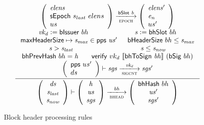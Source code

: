 \documentclass[11pt,a4paper]{article}
\newcommand{\var}[1]{\mathit{#1}}
\newcommand{\fun}[1]{\mathsf{#1}}
\newcommand{\trans}[2]{\xlongrightarrow[\textsc{#1}]{#2}}
\newcommand{\serialised}[1]{\llbracket \var{#1} \rrbracket}
\newcommand{\leteq}{\ensuremath{\mathrel{\mathop:}=}}
\newcommand{\bhdrsizename}{bHeaderSize}
\newcommand{\verifyname}{verify}
\newcommand{\bsigname}{bSig}
\newcommand{\bissuername}{bIssuer}
\newcommand{\verify}[3]{\fun{\verifyname} ~ #1 ~ #2 ~ #3}
\newcommand{\bhdrsize}[1]{\fun{\bhdrsizename} ~ #1}
\newcommand{\bsig}[1]{\fun{\bsigname} ~ #1}
\newcommand{\bissuer}[1]{\fun{\bissuername} ~ #1}
\begin{document}
\begin{figure}[ht]
  \begin{equation*}
    \inference
    { {\left(
          \begin{array}{l}
            \var{elens} \\
            \sepoch{s_{last}}{elens} \\
            us
          \end{array}
        \right)}
      \trans{epoch}{\bslot{b}}
      {\left(
          \begin{array}{l}
            \var{elens'} \\
            \var{e_n} \\
            us'
          \end{array}
        \right)}
      \\
      \var{vk_d} \leteq \bissuer{bh} & \var{s} \leteq \bhslot{bh}
      \\ \maxheadersize \mapsto \var{s_{max}} \in \fun{pps}~\var{us'} & \bhdrsize{bh} \leq \var{s_{max}}
      \\ \var{s} > \var{s_{last}} & \var{s} \leq \var{s_{now}}
      \\ \bhprevhash{bh} = \var{h} & \verify{vk_d}{\serialised{\bhtosign{bh}}}{(\bsig{bh})}
      \\
      {\left(
          \begin{array}{l}
            \fun{pps} ~  us' \\
            ds
          \end{array}
        \right)}
      \vdash
      \var{sgs} \trans{sigcnt}{\var{vk_d}} \var{sgs'}
      \\
    }
    {
      \left(
        {\begin{array}{c}
           \var{ds} \\
           \var{s_{last}} \\
           \var{s_{now}} \\
         \end{array}}
     \right)
     \vdash
     \left(
       {\begin{array}{c}
          \var{h} \\
          \var{us} \\
          \var{sgs}
        \end{array}}
    \right)
    \trans{bhead}{\var{bh}}
    \left(
      {\begin{array}{c}
         \bhhash{bh} \\
         \var{us'} \\
         \var{sgs}'
       \end{array}}
   \right)
 }
\end{equation*}
\caption{Block header processing rules}
\label{fig:rules:bhead}
\end{figure}
\end{document}
